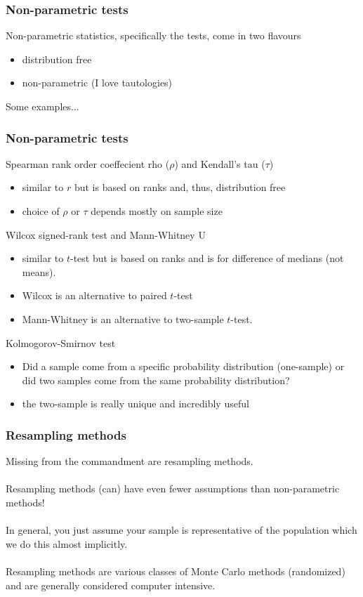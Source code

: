 \documentclass{beamer}\usepackage{graphicx, color}
\begin{document}
\begin{frame}
\frametitle{Non-parametric tests}
Non-parametric statistics, specifically the tests, come in two flavours

\begin{itemize}
\item distribution free
\item non-parametric (I love tautologies)
\end{itemize}

Some examples...
\end{frame}


\begin{frame}
\frametitle{Non-parametric tests}

Spearman rank order coeffecient rho (\(\rho\)) and Kendall's tau (\(\tau\))
\begin{itemize}
\item similar to \(r\) but is based on ranks and, thus, distribution free
\item choice of \(\rho\) or \(\tau\) depends mostly on sample size
\end{itemize}
Wilcox signed-rank test and Mann-Whitney U
\begin{itemize}
\item similar to \(t\)-test but is based on ranks and is for difference of medians (not means). 
\item Wilcox is an alternative to paired \(t\)-test
\item Mann-Whitney is an alternative to two-sample \(t\)-test.
\end{itemize}
Kolmogorov-Smirnov test
\begin{itemize}
\item Did a sample come from a specific probability distribution (one-sample) or did two samples come from the same probability distribution?
\item the two-sample is really unique and incredibly useful
\end{itemize}
\end{frame}


\begin{frame}
\frametitle{Resampling methods}
Missing from the commandment are resampling methods.
\\~\\
Resampling methods (can) have even fewer assumptions than non-parametric methods!
\\~\\
In general, you just assume your sample is representative of the population which we do this almost implicitly.
\\~\\
Resampling methods are various classes of Monte Carlo methods (randomized) and are generally considered computer intensive.
\end{frame}
\end{document}
